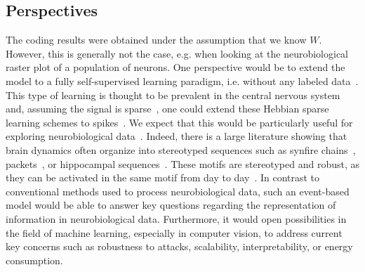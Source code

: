\documentclass[runningheads]{llncs}
\begin{document}
\subsection{Perspectives}
The coding results were obtained under the assumption that we know $W$. However, this is generally not the case, e.g. when looking at the neurobiological raster plot of a population of neurons. One perspective would be to extend the model to a fully self-supervised learning paradigm, i.e. without any labeled data~\cite{barlow_unsupervised_1989}. This type of learning is thought to be prevalent in the central nervous system and, assuming the signal is sparse~\cite{olshausen_emergence_1996}, one could extend these Hebbian sparse learning schemes to spikes~\cite{perrinet_emergence_2004,masquelier_competitive_2009}. We expect that this would be particularly useful for exploring neurobiological data~\cite{mackevicius_unsupervised_2019}. Indeed, there is a large literature showing that brain dynamics often organize into stereotyped sequences such as synfire chains~\cite{ikegaya_synfire_2004}, packets~\cite{luczak_sequential_2007}, or hippocampal sequences~\cite{pastalkova_internally_2008,villette_internally_2015}. These motifs are stereotyped and robust, as they can be activated in the same motif from day to day~\cite{haimerl_internal_2019}. In contrast to conventional methods used to process neurobiological data, such an event-based model would be able to answer key questions regarding the representation of information in neurobiological data. Furthermore, it would open possibilities in the field of machine learning, especially in computer vision, to address current key concerns such as robustness to attacks, scalability, interpretability, or energy consumption.
\end{document}
